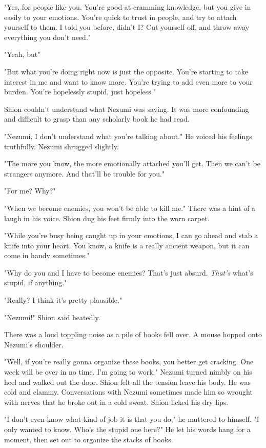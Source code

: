 "Yes, for people like you. You're good at cramming knowledge, but you
give in easily to your emotions. You're quick to trust in people, and
try to attach yourself to them. I told you before, didn't I? Cut
yourself off, and throw away everything you don't need."

"Yeah, but\el "

"But what you're doing right now is just the opposite. You're starting
to take interest in me and want to know more. You're trying to add even
more to your burden. You're hopelessly stupid, just hopeless."

Shion couldn't understand what Nezumi was saying. It was more
confounding and difficult to grasp than any scholarly book he had read.

"Nezumi, I don't understand what you're talking about." He voiced his
feelings truthfully. Nezumi shrugged slightly.

"The more you know, the more emotionally attached you'll get. Then we
can't be strangers anymore. And that'll be trouble for you."

"For me? Why?"

"When we become enemies, you won't be able to kill me." There was a hint
of a laugh in his voice. Shion dug his feet firmly into the worn carpet.

"While you're busy being caught up in your emotions, I can go ahead and
stab a knife into your heart. You know, a knife is a really ancient
weapon, but it can come in handy sometimes."

"Why do you and I have to become enemies? That's just absurd. \emph{That's}
what's stupid, if anything."

"Really? I think it's pretty plausible."

"Nezumi!" Shion said heatedly.

There was a loud toppling noise as a pile of books fell over. A mouse
hopped onto Nezumi's shoulder.

"Well, if you're really gonna organize these books, you better get
cracking. One week will be over in no time. I'm going to work." Nezumi
turned nimbly on his heel and walked out the door. Shion felt all the
tension leave his body. He was cold and clammy. Conversations with
Nezumi sometimes made him so wrought with nerves that he broke out in a
cold sweat. Shion licked his dry lips.

"I don't even know what kind of job it is that you do," he muttered to
himself. "I only wanted to know. Who's the stupid one here?" He let his
words hang for a moment, then set out to organize the stacks of books.

